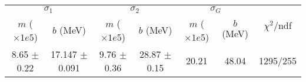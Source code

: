 \begin{tabular}{cc|cc|cc||c}
\multicolumn{2}{c|}{$\sigma_1$} & \multicolumn{2}{|c}{$\sigma_2$} & \multicolumn{2}{|c}{$\sigma_G$}  & \multirow{2}{*}{$\chi^2/$ndf}\\
$m$ ($\times1e5$) & $b$ (MeV) & $m$ ($\times1e5$) & $b$ (MeV) & $m$ ($\times1e5$) & $b$ (MeV) & \\
\hline
8.65 $\pm$ 0.22 & 17.147 $\pm$ 0.091 & 9.76 $\pm$ 0.36 & 28.87 $\pm$ 0.15 & 20.21 & 48.04 & 1295/255\\
\end{tabular}
